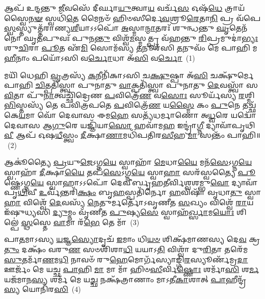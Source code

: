 \setcounter{anuvakam}{0}
𑌆𑌪᳴ 𑌉𑌨𑍍𑌦𑌨𑍍𑌤𑍁 \ul{𑌜𑍀}\-𑌵𑌸𑍇᳴ 𑌦𑍀𑌰𑍍𑌘𑌾\-\ul{𑌯𑍁}\-𑌤𑍍𑌵𑌾\-\ul{𑌯} 𑌵𑌰𑍍𑌚᳴\-\ul{𑌸} 𑌓𑌷᳴\-\ul{𑌧𑍇} 𑌤𑍍𑌰𑌾𑌯᳴𑌸𑍍𑌵𑍈\-\ul{𑌨}\-\-\ul{𑍟} 𑌸𑍍𑌵𑌧𑌿᳴\-\ul{𑌤𑍇} 𑌮𑍈𑌨𑍞᳴ 𑌹𑌿𑍞𑌸𑍀𑌰𑍍𑌦𑍇\-\ul{𑌵}\-𑌶𑍍𑌰𑍂\-\ul{𑌰𑍇}\-𑌤𑌾\-\ul{𑌨𑌿} 𑌪𑍍𑌰 𑌵᳴𑌪𑍇 \ul{𑌸𑍍𑌵}\-𑌸𑍍𑌤𑍍𑌯𑍁𑌤𑍍𑌤᳴𑌰𑌾𑌣𑍍𑌯\-\ul{𑌶𑍀}\-𑌯𑌾\-𑌽\-𑌽𑌪𑍋᳴ \ul{𑌅}\-𑌸𑍍𑌮𑌾\-\ul{𑌨𑍍𑌮𑌾}\-𑌤𑌰𑌃᳴ 𑌶𑍁𑌨𑍍𑌧𑌨𑍍𑌤𑍁 \ul{𑌘𑍃}\-𑌤𑍇𑌨᳴ 𑌨𑍋 𑌘𑍃\-\ul{𑌤}\-𑌪𑍁𑌵𑌃᳴ 𑌪𑍁𑌨\-\ul{𑌨𑍍𑌤𑍁} 𑌵𑌿𑌶𑍍𑌵᳴\-\ul{𑌮}\-𑌸𑍍𑌮𑌤𑍍𑌪𑍍𑌰 𑌵᳴𑌹𑌨𑍍𑌤𑍁 \ul{𑌰𑌿}\-𑌪𑍍𑌰𑌮𑍁𑌦𑌾॑\-\ul{𑌭𑍍𑌯𑌃} 𑌶𑍁\-\ul{𑌚𑌿}\-𑌰𑌾 \ul{𑌪𑍂}\-𑌤 𑌏᳴\-\ul{𑌮𑌿} 𑌸𑍋𑌮᳴𑌸𑍍𑌯 \ul{𑌤}\-𑌨𑍂𑌰᳴𑌸𑌿 \ul{𑌤}\-𑌨𑍁𑌵𑌂᳴ 𑌮𑍇 𑌪𑌾𑌹𑌿 𑌮\-\ul{𑌹𑍀}\-𑌨𑌾𑌂 𑌪𑌯𑍋᳴\-𑌽𑌸𑌿 𑌵\-\ul{𑌰𑍍𑌚𑍋}\-𑌧𑌾 𑌅᳴\-\ul{𑌸𑌿} 𑌵\-\ul{𑌰𑍍𑌚𑍋}\-~(1)

𑌮𑌯𑌿᳴ 𑌧𑍇𑌹𑌿 \ul{𑌵𑍃}\-𑌤𑍍𑌰𑌸𑍍𑌯᳴ \ul{𑌕}\-𑌨𑍀𑌨𑌿᳴𑌕𑌾\-𑌽𑌸𑌿 𑌚\-\ul{𑌕𑍍𑌷𑍁}\-𑌷𑍍𑌪𑌾 𑌅᳴\-\ul{𑌸𑌿} 𑌚𑌕𑍍𑌷𑍁᳴𑌰𑍍𑌮𑍇 𑌪𑌾𑌹𑌿 \ul{𑌚𑌿}\-𑌤𑍍𑌪𑌤𑌿᳴𑌸𑍍𑌤𑍍𑌵𑌾 𑌪𑍁𑌨𑌾𑌤𑍁 \ul{𑌵𑌾}\-𑌕𑍍𑌪𑌤𑌿᳴𑌸𑍍𑌤𑍍𑌵𑌾 𑌪𑍁𑌨𑌾𑌤𑍁 \ul{𑌦𑍇}\-𑌵𑌸𑍍𑌤𑍍𑌵𑌾᳴ 𑌸\-\ul{𑌵𑌿}\-𑌤𑌾 𑌪𑍁᳴\-\ul{𑌨𑌾}\-𑌤𑍍𑌵𑌚𑍍𑌛𑌿᳴𑌦𑍍𑌰𑍇𑌣 \ul{𑌪}\-𑌵𑌿𑌤𑍍𑌰𑍇᳴\-\ul{𑌣} 𑌵\-\ul{𑌸𑍋𑌃} 𑌸𑍂𑌰𑍍𑌯᳴𑌸𑍍𑌯 \ul{𑌰}\-𑌶𑍍𑌮𑌿\-\ul{𑌭𑌿}\-𑌸𑍍𑌤𑌸𑍍𑌯᳴ 𑌤𑍇 𑌪𑌵𑌿𑌤𑍍𑌰𑌪𑌤𑍇 \ul{𑌪}\-𑌵𑌿𑌤𑍍𑌰𑍇᳴\-\ul{𑌣} 𑌯\-\ul{𑌸𑍍𑌮𑍈} 𑌕𑌂 \ul{𑌪𑍁}\-𑌨𑍇 𑌤𑌚𑍍𑌛᳴𑌕𑍇\-\ul{𑌯}\-𑌮𑌾 𑌵𑍋᳴ 𑌦𑍇𑌵𑌾𑌸 𑌈𑌮\-\ul{𑌹𑍇} 𑌸𑌤𑍍𑌯᳴𑌧𑌰𑍍𑌮𑌾𑌣𑍋 𑌅\-\ul{𑌧𑍍𑌵}\-𑌰𑍇 𑌯𑌦𑍍𑌵𑍋᳴ 𑌦𑍇𑌵𑌾𑌸 𑌆\-\ul{𑌗𑍁}\-𑌰𑍇 𑌯𑌜𑍍𑌞𑌿᳴𑌯𑌾\-\ul{𑌸𑍋} 𑌹𑌵𑌾᳴𑌮\-\ul{𑌹} 𑌇𑌨𑍍𑌦𑍍𑌰𑌾॑\-\ul{𑌗𑍍𑌨𑍀} 𑌦𑍍𑌯𑌾𑌵𑌾᳴𑌪𑍃𑌥𑌿\-\ul{𑌵𑍀} 𑌆𑌪᳴ 𑌓𑌷\-\ul{𑌧𑍀}\-𑌸𑍍𑌤𑍍𑌵𑌂 \ul{𑌦𑍀}\-𑌕𑍍𑌷𑌾\-\ul{𑌣𑌾}\-𑌮𑌧𑌿᳴𑌪𑌤𑌿𑌰\-\ul{𑌸𑍀}\-𑌹 \ul{𑌮𑌾} 𑌸𑌨𑍍𑌤𑌂᳴ 𑌪𑌾𑌹𑌿॥~(2)

{\anuvakamend[{𑌵𑌰𑍍𑌚᳴ 𑌓𑌷𑌧𑍀\-\ul{𑌰}\-𑌷𑍍𑌟𑍗 𑌚᳴}]}%

𑌆𑌕𑍂॑𑌤𑍍𑌯𑍈 \ul{𑌪𑍍𑌰}\-𑌯𑍁\-\ul{𑌜𑍇}\-\-𑌽𑌗𑍍𑌨\-\ul{𑌯𑍇} 𑌸𑍍𑌵𑌾𑌹𑌾᳴ \ul{𑌮𑍇}\-𑌧𑌾\-\ul{𑌯𑍈} 𑌮𑌨᳴\-\ul{𑌸𑍇}\-\-𑌽𑌗𑍍𑌨\-\ul{𑌯𑍇} 𑌸𑍍𑌵𑌾𑌹𑌾᳴ \ul{𑌦𑍀}\-𑌕𑍍𑌷𑌾\-\ul{𑌯𑍈} 𑌤𑌪᳴\-\ul{𑌸𑍇}\-\-𑌽𑌗𑍍𑌨\-\ul{𑌯𑍇} 𑌸𑍍𑌵𑌾\-\ul{𑌹𑌾} 𑌸𑌰᳴𑌸𑍍𑌵𑌤𑍍𑌯𑍈 \ul{𑌪𑍂}\-𑌷𑍍𑌣𑍇॑\-𑌽𑌗𑍍𑌨\-\ul{𑌯𑍇} 𑌸𑍍𑌵𑌾𑌹𑌾\-𑌽\-𑌽𑌪𑍋᳴ 𑌦𑍇𑌵𑍀𑌰𑍍𑌬𑍃𑌹𑌤𑍀𑌰𑍍𑌵𑌿𑌶𑍍𑌵𑌶𑌮𑍍𑌭𑍁\-\ul{𑌵𑍋} 𑌦𑍍𑌯𑌾𑌵𑌾᳴𑌪𑍃\-\ul{𑌥𑌿}\-𑌵𑍀 \ul{𑌉}\-𑌰𑍍𑌵᳴𑌨𑍍𑌤𑌰𑌿᳴\-\ul{𑌕𑍍𑌷𑌂} 𑌬𑍃\-\ul{𑌹}\-𑌸𑍍𑌪𑌤𑌿᳴𑌰𑍍𑌨𑍋 \ul{𑌹}\-𑌵𑌿𑌷𑌾᳴ 𑌵𑍃𑌧𑌾\-\ul{𑌤𑍁} 𑌸𑍍𑌵𑌾\-\ul{𑌹𑌾} 𑌵𑌿𑌶𑍍𑌵𑍇᳴ \ul{𑌦𑍇}\-𑌵𑌸𑍍𑌯᳴ \ul{𑌨𑍇}\-𑌤𑍁𑌰𑍍𑌮𑌰𑍍𑌤𑍋᳴\-𑌽𑌵𑍃𑌣𑍀𑌤 \ul{𑌸}\-𑌖𑍍𑌯𑌂 𑌵𑌿𑌶𑍍𑌵𑍇᳴ \ul{𑌰𑌾}\-𑌯 𑌇᳴𑌷𑍁𑌧𑍍𑌯𑌸𑌿 \ul{𑌦𑍍𑌯𑍁}\-𑌮𑍍𑌨𑌂 𑌵𑍃᳴𑌣𑍀𑌤 \ul{𑌪𑍁}\-𑌷𑍍𑌯\-\ul{𑌸𑍇} 𑌸𑍍𑌵𑌾𑌹᳴\-\ul{𑌰𑍍𑌖𑍍𑌸𑌾}\-𑌮\-\ul{𑌯𑍋𑌃} 𑌶𑌿𑌲𑍍𑌪𑍇॑ \ul{𑌸𑍍𑌥}\-𑌸𑍍𑌤𑍇 \ul{𑌵𑌾}\-𑌮𑌾 𑌰᳴\-\ul{𑌭𑍇} 𑌤𑍇 𑌮𑌾᳴~(3)

𑌪𑌾\-\ul{𑌤}\-𑌮𑌾\-𑌽𑌸𑍍𑌯 \ul{𑌯}\-𑌜𑍍𑌞\-\ul{𑌸𑍍𑌯𑍋}\-𑌦𑍃𑌚᳴ \ul{𑌇}\-𑌮𑌾𑌂 𑌧𑌿\-\ul{𑌯}\-\-\ul{𑍞} 𑌶𑌿𑌕𑍍𑌷᳴𑌮𑌾𑌣𑌸𑍍𑌯 𑌦𑍇\-\ul{𑌵} 𑌕𑍍𑌰\-\ul{𑌤𑍁𑌂} 𑌦𑌕𑍍𑌷𑌂᳴ 𑌵𑌰𑍁\-\ul{𑌣} 𑌸𑍞𑌶𑌿᳴𑌶𑌾\-\ul{𑌧𑌿} 𑌯𑌯𑌾\-𑌽\-\ul{𑌤𑌿} 𑌵𑌿𑌶𑍍𑌵𑌾᳴ 𑌦𑍁\-\ul{𑌰𑌿}\-𑌤𑌾 𑌤𑌰𑍇᳴𑌮 \ul{𑌸𑍁}\-𑌤𑌰𑍍𑌮𑌾᳴\-\ul{𑌣}\-𑌮\-\ul{𑌧𑌿} 𑌨𑌾𑌵𑍞᳴ 𑌰𑍁\-\ul{𑌹𑍇}\-𑌮𑍋𑌰𑍍𑌗᳴𑌸𑍍𑌯𑌾𑌙𑍍𑌗𑌿\-\ul{𑌰}\-𑌸𑍍𑌯𑍂𑌰𑍍𑌣᳴𑌮𑍍𑌰\-\ul{𑌦𑌾} 𑌊𑌰𑍍𑌜𑌂᳴ 𑌮𑍇 𑌯𑌚𑍍𑌛 \ul{𑌪𑌾}\-𑌹𑌿 \ul{𑌮𑌾} 𑌮𑌾 𑌮𑌾᳴ 𑌹𑌿𑍞\-\ul{𑌸𑍀}\-𑌰𑍍𑌵𑌿\-\ul{𑌷𑍍𑌣𑍋𑌃} 𑌶𑌰𑍍𑌮𑌾᳴\-\ul{𑌸𑌿} 𑌶\-\ul{𑌰𑍍𑌮} 𑌯𑌜᳴𑌮𑌾𑌨\-\ul{𑌸𑍍𑌯} 𑌶𑌰𑍍𑌮᳴ 𑌮𑍇 𑌯\-\ul{𑌚𑍍𑌛} 𑌨𑌕𑍍𑌷᳴𑌤𑍍𑌰𑌾𑌣𑌾𑌂 𑌮𑌾\-𑌽𑌤𑍀\-\ul{𑌕𑌾}\-𑌶𑌾𑌤𑍍 \ul{𑌪𑌾}\-𑌹𑍀𑌨𑍍𑌦𑍍𑌰᳴\-\ul{𑌸𑍍𑌯} 𑌯𑍋𑌨𑌿᳴𑌰\-\ul{𑌸𑌿}\-~(4)

